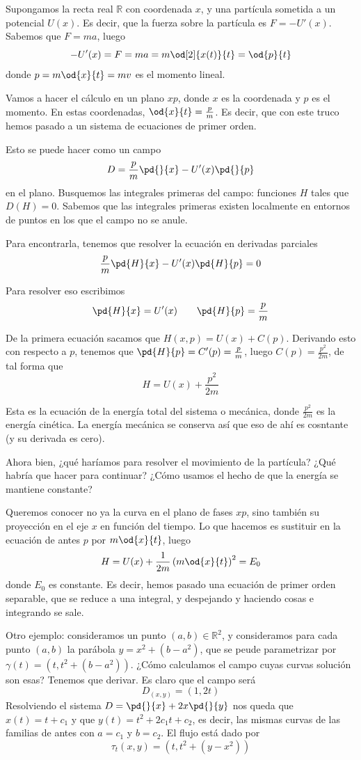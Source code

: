 Supongamos la recta real $ℝ$ con coordenada $x$, y una partícula sometida a un potencial $U(x)$. Es decir, que la fuerza sobre la partícula es $F = -U'(x)$. Sabemos que $F = ma$, luego \[ -U'(x) = F = m a = m \od[2]{x(t)}{t} = \od{p}{t} \] donde $p = m \od{x}{t} = mv$ es el momento lineal.

Vamos a hacer el cálculo en un plano $xp$, donde $x$ es la coordenada y $p$ es el momento. En estas coordenadas, $\od{x}{t} = \frac{p}{m}$. Es decir, que con este truco hemos pasado a un sistema de ecuaciones de primer orden.

Esto se puede hacer como un campo \[ D = \frac{p}{m}\pd{}{x} - U'(x) \pd{}{p} \] en el plano. Busquemos las integrales primeras del campo: funciones $H$ tales que $D(H) = 0$. Sabemos que las integrales primeras existen localmente en entornos de puntos en los que el campo no se anule.

Para encontrarla, tenemos que resolver la ecuación en derivadas parciales \[ \frac{p}{m} \pd{H}{x} - U'(x) \pd{H}{p} = 0 \]

Para resolver eso escribimos \[ \pd{H}{x} = U'(x) \qquad \pd{H}{p} = \frac{p}{m}\]

De la primera ecuación sacamos que $H(x,p) = U(x) + C(p)$. Derivando esto con respecto a $p$, tenemos que $\pd{H}{p} = C'(p) = \frac{p}{m}$, luego $C(p) = \frac{p^2}{2m}$, de tal forma que \[ H = U(x) + \frac{p^2}{2m} \]

Esta es la ecuación de la energía total del sistema o mecánica, donde $\frac{p^2}{2m}$ es la energía cinética. La energía mecánica se conserva así que eso de ahí es cosntante (y su derivada es cero).

Ahora bien, ¿qué haríamos para resolver el movimiento de la partícula? ¿Qué habría que hacer para continuar? ¿Cómo usamos el hecho de que la energía se mantiene constante?

Queremos conocer no ya la curva en el plano de fases $xp$, sino también su proyección en el eje $x$ en función del tiempo. Lo que hacemos es sustituir en la ecuación de antes $p$ por $m\od{x}{t}$, luego \[ H = U(x) + \frac{1}{2m}\left(m\od{x}{t}\right)^2 = E_0 \] donde $E_0$ es constante. Es decir, hemos pasado una ecuación de primer orden separable, que se reduce a una integral, y despejando y haciendo cosas e integrando se sale.

Otro ejemplo: consideramos un punto $(a,b) ∈ ℝ^2$, y consideramos para cada punto $(a,b)$ la parábola $y = x^2 + (b-a^2)$, que se peude parametrizar por $γ(t) = (t, t^2 + (b-a^2))$. ¿Cómo calculamos el campo cuyas curvas solución son esas? Tenemos que derivar. Es claro que el campo será \[ D_{(x,y)} = (1,2t) \] Resolviendo el sistema $D = \pd{}{x} + 2x \pd{}{y}$ nos queda que $x(t) = t +c_1$ y que $y(t) = t^2 + 2c_1 t + c_2$, es decir, las mismas curvas de las familias de antes con $a = c_1$ y $b =c_2$. El flujo está dado por \[ τ_t(x,y) = (t, t^2 + (y-x^2))\]

